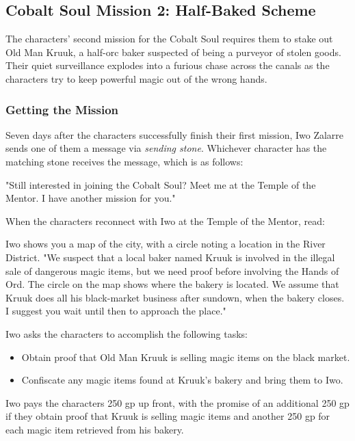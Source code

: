 \documentclass[letterpaper, 11pt, bg=full, twocolumn]{dndbook}
\begin{document}
\subsection{Cobalt Soul Mission 2: Half-Baked Scheme}

The characters' second mission for the Cobalt Soul requires them to stake out Old Man Kruuk, a half-orc baker suspected of being a purveyor of stolen goods. Their quiet surveillance explodes into a furious chase across the canals as the characters try to keep powerful magic out of the wrong hands.

\subsubsection{Getting the Mission}

Seven days after the characters successfully finish their first mission, Iwo Zalarre sends one of them a message via \textit{sending stone}. Whichever character has the matching stone receives the message, which is as follows:

\begin{DndReadAloud}
"Still interested in joining the Cobalt Soul? Meet me at the Temple of the Mentor. I have another mission for you."
\end{DndReadAloud}

When the characters reconnect with Iwo at the Temple of the Mentor, read:

\begin{DndReadAloud}
Iwo shows you a map of the city, with a circle noting a location in the River District. "We suspect that a local baker named Kruuk is involved in the illegal sale of dangerous magic items, but we need proof before involving the Hands of Ord. The circle on the map shows where the bakery is located. We assume that Kruuk does all his black-market business after sundown, when the bakery closes. I suggest you wait until then to approach the place."
\end{DndReadAloud}

Iwo asks the characters to accomplish the following tasks:

\begin{itemize}
\item Obtain proof that Old Man Kruuk is selling magic items on the black market.
\item Confiscate any magic items found at Kruuk's bakery and bring them to Iwo.
\end{itemize}

Iwo pays the characters 250 gp up front, with the promise of an additional 250 gp if they obtain proof that Kruuk is selling magic items and another 250 gp for each magic item retrieved from his bakery.
\end{document}
